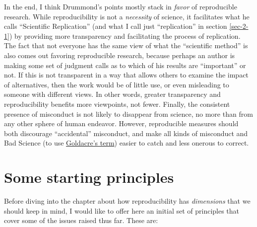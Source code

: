 \documentclass{book}
\begin{document}
In the end, I think Drummond's points mostly stack in \emph{favor} of reproducible research. While reproducibility is not a \emph{necessity} of science, it facilitates what he calls ``Scientific Replication'' (and what I call just ``replication'' in section \ref{sec-2-1}) by providing more transparency and facilitating the process of replication. The fact that not everyone has the same view of what the ``scientific method'' is also comes out favoring reproducible research, because perhaps an author is making some set of judgment calls as to which of his results are ``important'' or not. If this is not transparent in a way that allows others to examine the impact of alternatives, then the work would be of little use, or even misleading to someone with different views. In other words, greater transparency and reproducibility benefits more viewpoints, not fewer. Finally, the consistent presence of misconduct is not likely to disappear from science, no more than from any other sphere of human endeavor. However, reproducible measures should both discourage ``accidental'' misconduct, and make all kinds of misconduct and Bad Science (to use \href{http://www.badscience.net/}{Goldacre's term}) easier to catch and less onerous to correct.
\section{Some starting principles}
\label{sec-2-5}

Before diving into the chapter about how reproducibility has \emph{dimensions} that we should keep in mind, I would like to offer here an initial set of principles that cover some of the issues raised thus far.  These are:
\end{document}
